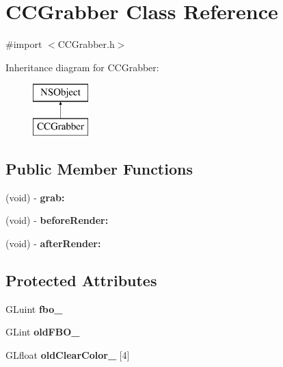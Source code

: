 \hypertarget{interface_c_c_grabber}{\section{C\-C\-Grabber Class Reference}
\label{interface_c_c_grabber}
}


{\ttfamily \#import $<$C\-C\-Grabber.\-h$>$}

Inheritance diagram for C\-C\-Grabber\-:\begin{figure}[H]
\begin{center}
\leavevmode
\includegraphics[height=2.000000cm]{interface_c_c_grabber}
\end{center}
\end{figure}
\subsection*{Public Member Functions}
\begin{DoxyCompactItemize}
\item 
\hypertarget{interface_c_c_grabber_a630672ac225930e2c8d44806bbaf0638}{(void) -\/ {\bfseries grab\-:}}\label{interface_c_c_grabber_a630672ac225930e2c8d44806bbaf0638}

\item 
\hypertarget{interface_c_c_grabber_ad823b9a1643b75353453c834f41e6e54}{(void) -\/ {\bfseries before\-Render\-:}}\label{interface_c_c_grabber_ad823b9a1643b75353453c834f41e6e54}

\item 
\hypertarget{interface_c_c_grabber_afde826ab4fe0daca1d04cc699afc7c3e}{(void) -\/ {\bfseries after\-Render\-:}}\label{interface_c_c_grabber_afde826ab4fe0daca1d04cc699afc7c3e}

\end{DoxyCompactItemize}
\subsection*{Protected Attributes}
\begin{DoxyCompactItemize}
\item 
\hypertarget{interface_c_c_grabber_ab646339c6b9020deebec014ee6bd2420}{G\-Luint {\bfseries fbo\-\_\-}}\label{interface_c_c_grabber_ab646339c6b9020deebec014ee6bd2420}

\item 
\hypertarget{interface_c_c_grabber_a70f80905904002ec39e50c8d38e616f9}{G\-Lint {\bfseries old\-F\-B\-O\-\_\-}}\label{interface_c_c_grabber_a70f80905904002ec39e50c8d38e616f9}

\item 
\hypertarget{interface_c_c_grabber_ae5f62850dd440e41e5c098998145632d}{G\-Lfloat {\bfseries old\-Clear\-Color\-\_\-} \mbox{[}4\mbox{]}}\label{interface_c_c_grabber_ae5f62850dd440e41e5c098998145632d}

\end{DoxyCompactItemize}


